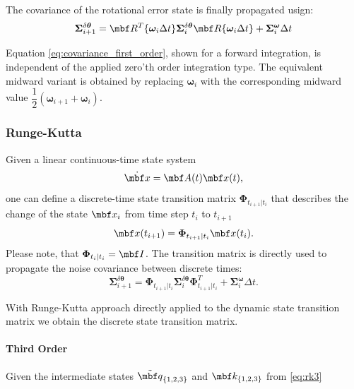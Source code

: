 \documentclass[10pt,a4paper]{article}
\newcommand{\mbs}[1]{{\boldsymbol{#1}}}
\numberwithin{equation}{section}
\begin{document}
The covariance of the rotational error state is finally propagated usign:
\begin{equation}
\mbs \Sigma_{i+1}^{\delta \mbs \theta} = \mbf R^T \lbrace \mbs \omega_i \Delta t \rbrace
\mbs \Sigma_{i}^{\delta \mbs \theta}
\mbf R \lbrace \mbs \omega_i \Delta t \rbrace + 
\mbs \Sigma^{\mbs \omega}_i \Delta t
\label{eq:covariance_first_order}
\end{equation}

Equation \eqref{eq:covariance_first_order}, shown for a forward integration, is independent of the applied zero'th order integration type. The equivalent midward variant is obtained by replacing $\mbs \omega_i$ with the corresponding midward value $\dfrac{1}{2} (\mbs \omega_{i+1} + \mbs \omega_i)$.

\subsubsection{Runge-Kutta}
Given a linear continuous-time state system
\begin{equation}
\dot{\mbf x} = \mbf A(t) \mbf x(t),
\end{equation}
one can define a discrete-time state transition matrix $\mbs \Phi_{t_{i+1} | t_i}$ that describes the change of the state $\mbf x_i$ from time step $t_{i}$ to $t_{i+1}$
\begin{equation}
\mbf x(t_{i+1}) = \mbs \Phi_{t_{i+1} | t_i} \mbf x(t_i).
\end{equation}
Please note, that  $\mbs \Phi_{t_{i} | t_i} = \mbf I$.
The transition matrix is directly used to propagate the noise covariance between discrete times:
\begin{equation}
\mbs \Sigma_{i+1}^{\delta \mbs \theta} = \mbs \Phi_{t_{i+1} | t_i}
\mbs \Sigma_{i}^{\delta \mbs \theta}
\mbs \Phi_{t_{i+1} | t_i}^T
 + 
\mbs \Sigma^{\mbs \omega}_i \Delta t.
\label{eq:covariance_first_order}
\end{equation}

With Runge-Kutta approach directly applied to the dynamic state transition matrix we obtain the discrete state transition matrix.

\paragraph{Third Order}

Given the intermediate states $\tilde{\mbf q}_{\lbrace 1,2,3 \rbrace}$ and $\mbf k_{\lbrace 1, 2, 3 \rbrace}$ from \eqref{eq:rk3}
\end{document}
